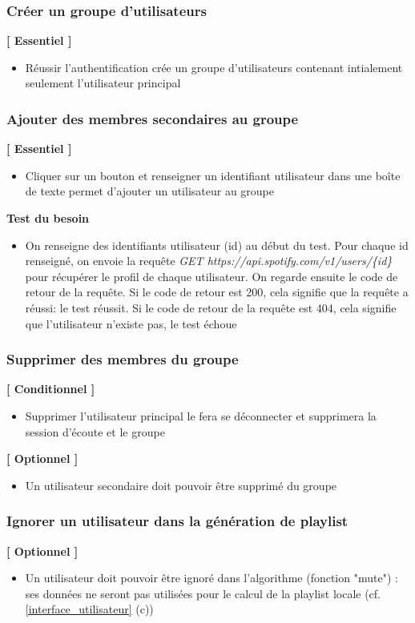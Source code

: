 \documentclass{article}
\begin{document}
		\subsubsection{Créer un groupe d'utilisateurs}
		\textbf{[ Essentiel ]}
		\begin{itemize}
			\item Réussir l'authentification crée un groupe d'utilisateurs contenant intialement seulement l'utilisateur principal
		\end{itemize}
		\subsubsection{Ajouter des membres secondaires au groupe}  \label{connexion}
		\textbf{[ Essentiel ]}
		\begin{itemize}
			\item Cliquer sur un bouton et renseigner un identifiant utilisateur dans une boîte de texte permet d'ajouter un utilisateur au groupe
		\end{itemize}
		\textbf{Test du besoin} 
		\begin{itemize}
			\item On renseigne des identifiants utilisateur (id) au début du test. Pour chaque id renseigné, on envoie la requête \textit{GET https://api.spotify.com/v1/users/\{id\}} pour récupérer le profil de chaque utilisateur. On regarde ensuite le code de retour de la requête. Si le code de retour est 200, cela signifie que la requête a réussi: le test réussit. Si le code de retour de la requête est 404, cela signifie que l'utilisateur n'existe pas, le test échoue
		\end{itemize}
		\subsubsection{Supprimer des membres du groupe}
		\textbf{[ Conditionnel ]}
		\begin{itemize}
			\item Supprimer l'utilisateur principal le fera se déconnecter et supprimera la session d'écoute et le groupe
		\end{itemize}
		\textbf{[ Optionnel ]}
		\begin{itemize}
			\item Un utilisateur secondaire doit pouvoir être supprimé du groupe
		\end{itemize}
						            
		\subsubsection{Ignorer un utilisateur dans la génération de playlist}
		\textbf{[ Optionnel ]}
		\begin{itemize}
			\item Un utilisateur doit pouvoir être ignoré dans l'algorithme (fonction "mute") : ses données ne seront pas utilisées pour le calcul de la playlist locale (cf. \ref{interface_utilisateur} (c))
		\end{itemize}
		\newpage		            
\end{document}
